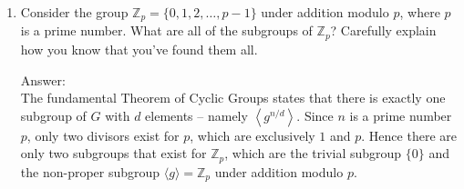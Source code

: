 \documentclass[11pt,twoside]{article}
\DeclareMathOperator{\ord}{ord}
\begin{document}
\begin{enumerate}
\begin{enumerate}
\begin{proof}[\color{red}Proof.]
Conversely, suppose $\text{gcd}(n,k) = 1$ and consider the cyclic group $G = \mathbb{Z}_n$ under addition modulo $n$.  Given any subgroup $\langle k \rangle$, $\ord(k) = \frac{n}{\operatorname{gcd}(k,n)} = n$, which is the number of elements in $G$.  Since $\langle k \rangle$ contains all elements in $\mathbb{Z}_n$, it generates $\mathbb{Z}_n$ under addition modulo $n$.
\end{proof}

\vspace{0.25cm}

\end{enumerate}

\item Consider the group $\mathbb{Z}_p = \{0,1,2,\ldots, p-1\}$ under addition modulo $p$, where $p$ is a prime number.  What are all of the subgroups of $\mathbb{Z}_p$?  Carefully explain how you know that you've found them all.

{\color{red}Answer:}\\
The fundamental Theorem of Cyclic Groups states that there is exactly one subgroup of $G$ with $d$ elements -- namely $\left\langle g^{n/d} \right\rangle$.  Since $n$ is a prime number $p$, only two divisors exist for $p$, which are exclusively $1$ and $p$.  Hence there are only two subgroups that exist for $\mathbb{Z}_p$, which are the trivial subgroup $\{ 0 \}$ and the non-proper subgroup $\langle g \rangle = \mathbb{Z}_p$ under addition modulo $p$.

\end{enumerate}
\end{document}
